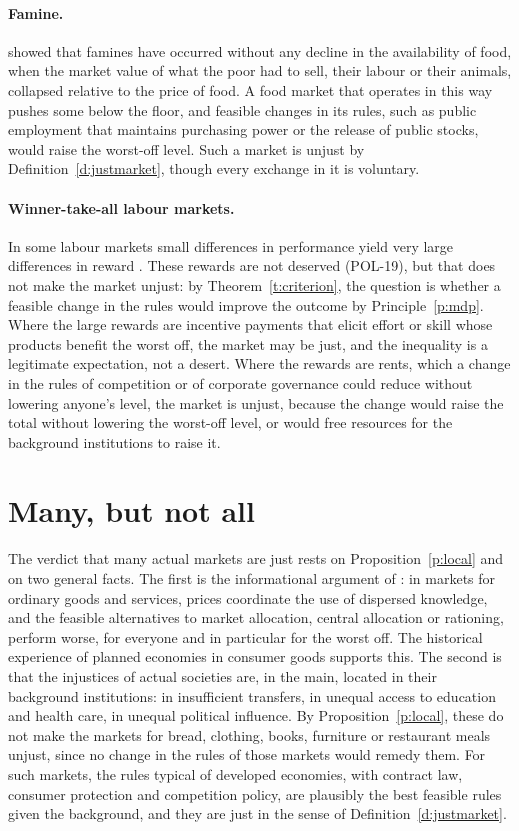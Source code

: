 \documentclass{situationist-preprint}
\begin{document}
\paragraph{Famine.} \citet{Sen1981} showed that famines have occurred without any decline in the availability of food, when the market value of what the poor had to sell, their labour or their animals, collapsed relative to the price of food. A food market that operates in this way pushes some below the floor, and feasible changes in its rules, such as public employment that maintains purchasing power or the release of public stocks, would raise the worst-off level. Such a market is unjust by Definition~\ref{d:justmarket}, though every exchange in it is voluntary.

\paragraph{Winner-take-all labour markets.} In some labour markets small differences in performance yield very large differences in reward \citep{Frank2016}. These rewards are not deserved (POL-19), but that does not make the market unjust: by Theorem~\ref{t:criterion}, the question is whether a feasible change in the rules would improve the outcome by Principle~\ref{p:mdp}. Where the large rewards are incentive payments that elicit effort or skill whose products benefit the worst off, the market may be just, and the inequality is a legitimate expectation, not a desert. Where the rewards are rents, which a change in the rules of competition or of corporate governance could reduce without lowering anyone's level, the market is unjust, because the change would raise the total without lowering the worst-off level, or would free resources for the background institutions to raise it.

\section{Many, but not all}

The verdict that many actual markets are just rests on Proposition~\ref{p:local} and on two general facts. The first is the informational argument of \citet{Hayek1945}: in markets for ordinary goods and services, prices coordinate the use of dispersed knowledge, and the feasible alternatives to market allocation, central allocation or rationing, perform worse, for everyone and in particular for the worst off. The historical experience of planned economies in consumer goods supports this. The second is that the injustices of actual societies are, in the main, located in their background institutions: in insufficient transfers, in unequal access to education and health care, in unequal political influence. By Proposition~\ref{p:local}, these do not make the markets for bread, clothing, books, furniture or restaurant meals unjust, since no change in the rules of those markets would remedy them. For such markets, the rules typical of developed economies, with contract law, consumer protection and competition policy, are plausibly the best feasible rules given the background, and they are just in the sense of Definition~\ref{d:justmarket}.
\end{document}
